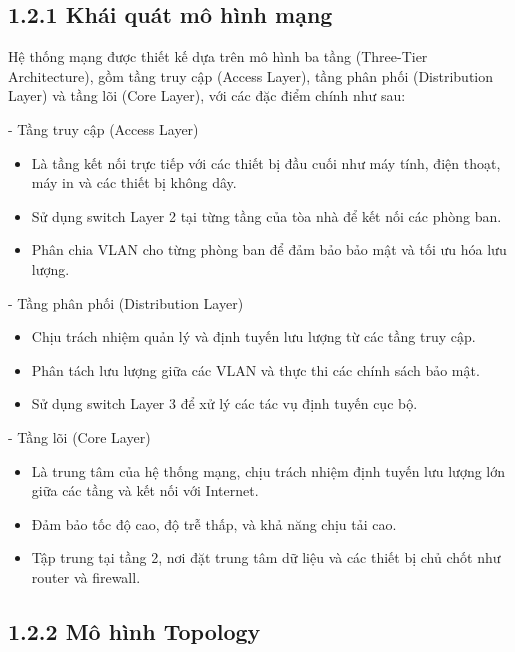 \subsection*{1.2.1 Khái quát mô hình mạng}

Hệ thống mạng được thiết kế dựa trên mô hình ba tầng (Three-Tier Architecture), gồm tầng truy cập (Access Layer), tầng phân phối (Distribution Layer) và tầng lõi (Core Layer), với các đặc điểm chính như sau:

- Tầng truy cập (Access Layer)
\begin{itemize}[left=2cm]
    \item Là tầng kết nối trực tiếp với các thiết bị đầu cuối như máy tính, điện thoạt, máy in và các thiết bị không dây.
    \item Sử dụng switch Layer 2 tại từng tầng của tòa nhà để kết nối các phòng ban.
    \item Phân chia VLAN cho từng phòng ban để đảm bảo bảo mật và tối ưu hóa lưu lượng.
\end{itemize}

- Tầng phân phối (Distribution Layer)
\begin{itemize}[left=2cm]
    \item Chịu trách nhiệm quản lý và định tuyến lưu lượng từ các tầng truy cập.
    \item Phân tách lưu lượng giữa các VLAN và thực thi các chính sách bảo mật.
    \item Sử dụng switch Layer 3 để xử lý các tác vụ định tuyến cục bộ.
\end{itemize}

- Tầng lõi (Core Layer)
\begin{itemize}[left=2cm]
    \item Là trung tâm của hệ thống mạng, chịu trách nhiệm định tuyến lưu lượng lớn giữa các tầng và kết nối với Internet.
    \item Đảm bảo tốc độ cao, độ trễ thấp, và khả năng chịu tải cao.
    \item Tập trung tại tầng 2, nơi đặt trung tâm dữ liệu và các thiết bị chủ chốt như router và firewall.
\end{itemize}

\subsection*{1.2.2 Mô hình Topology}

